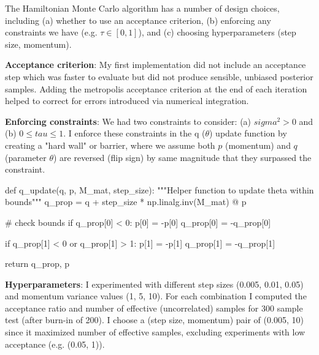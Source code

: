 \documentclass[12pt,letterpaper,twoside]{article}
\begin{document}
The Hamiltonian Monte Carlo algorithm has a number of design 
choices, including (a) whether to use an acceptance criterion, 
(b) enforcing any constraints we have (e.g. $\tau \in [0,1]$), 
and (c) choosing hyperparameters (step size, momentum).

\textbf{Acceptance criterion}: My first implementation did not 
include an acceptance step which was faster to evaluate but did 
not produce sensible, unbiased posterior samples. Adding the 
metropolis acceptance criterion at the end of each iteration 
helped to correct for errors introduced via numerical 
integration.

\textbf{Enforcing constraints}: We had two constraints to consider: (a) $sigma^2 > 0$ 
and (b) $0 \le tau \le 1$. I enforce these constraints in the q 
($\theta$) update function by creating a "hard wall" or barrier, 
where we assume both $p$ (momentum) and $q$ (parameter $\theta$) 
are reversed (flip sign) by same magnitude that they surpassed 
the constraint.

\begin{python}
def q_update(q, p, M_mat, step_size):
    """Helper function to update theta within bounds"""
    q_prop = q + step_size * np.linalg.inv(M_mat) @ p

    # check bounds
    if q_prop[0] < 0:
        p[0] = -p[0]
        q_prop[0] = -q_prop[0]

    if q_prop[1] < 0 or q_prop[1] > 1:
        p[1] = -p[1]
        q_prop[1] = -q_prop[1]

    return q_prop, p
\end{python}

\textbf{Hyperparameters}: I experimented with different step 
sizes (0.005, 0.01, 0.05) and momentum variance values (1, 5, 10). 
For each combination I computed the acceptance ratio and number of 
effective (uncorrelated) samples for 300 sample test (after 
burn-in of 200). I choose a (step size, momentum) pair of 
(0.005, 10) since it maximized number of effective samples, 
excluding experiments with low acceptance (e.g. (0.05, 1)).
\end{document}
